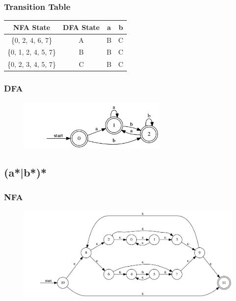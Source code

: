 \documentclass[paper=a4, fontsize=11pt]{scrartcl} %
\numberwithin{equation}{section} %
\numberwithin{figure}{section} %
\numberwithin{table}{section} %
\begin{document}
\subsubsection*{Transition Table}
\begin{table}[H]
\centering
\begin{tabular}{|c|c|c|c|}
\hline
NFA State & DFA State & a & b \\
\hline
\{0, 2, 4, 6, 7\} & A & B & C \\
\hline
\{0, 1, 2, 4, 5, 7\} & B & B & C \\
\hline
\{0, 2, 3, 4, 5, 7\} & C & B & C \\
\hline
\end{tabular}
\end{table}
\subsubsection*{DFA}
\begin{figure}[H]
\centering
\includegraphics[width=0.65\textwidth]{3_1_2.png}
\label{fig:3_1_2}
\end{figure}

\subsection{(a*|b*)*}
\subsubsection*{NFA}
\begin{figure}[H]
\centering
\includegraphics[width=1\textwidth]{3_2_1.png}
\label{fig:3_2_1}
\end{figure}
\end{document}
